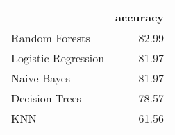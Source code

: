 \begin{tabular}{lr}
\toprule
{} &  accuracy \\
\midrule
Random Forests      &     82.99 \\
Logistic Regression &     81.97 \\
Naive Bayes         &     81.97 \\
Decision Trees      &     78.57 \\
KNN                 &     61.56 \\
\bottomrule
\end{tabular}

